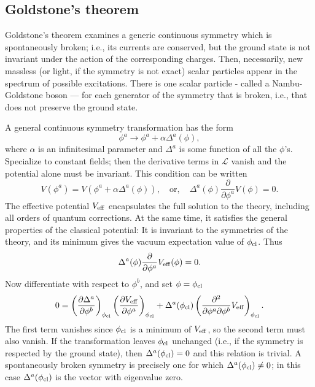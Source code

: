 \subsection{Goldstone's theorem}
\begin{newthem}
Goldstone's theorem examines a generic continuous symmetry which is spontaneously broken; i.e., its currents are conserved, but the ground state is not invariant under the action of the corresponding charges. Then, necessarily, new massless (or light, if the symmetry is not exact) scalar particles appear in the spectrum of possible excitations. There is one scalar particle - called a Nambu-Goldstone boson — for each generator of the symmetry that is broken, i.e., that does not preserve the ground state.
\end{newthem}
\begin{newproof}
A general continuous symmetry transformation has the form
\[\phi^a \to \phi^a + \alpha \Delta^a (\phi),\]
where $\alpha$ is an infinitesimal parameter and $\Delta^a$ is some function of all the $\phi$'s. Specialize to constant fields; then the derivative terms in $\mathcal{L}$ vanish and the potential alone must be invariant. This condition can be written
\[V(\phi^a) = V(\phi^a + \alpha \Delta^a (\phi)) , \quad \mbox{or} , \quad \Delta^a(\phi) \frac{\partial}{\partial \phi^a} V(\phi) = 0.\]
The effective potential $V_{\rm eff}$ encapsulates the full solution to the theory, including all orders of quantum corrections. At the same time, it satisfies the general properties of the classical potential: It is invariant to the symmetries of the theory, and its minimum gives the vacuum expectation value of $\phi_{\rm cl}$. Thus
\[\Delta^a(\phi) \frac{\partial}{\partial \phi^a} V_{\rm eff}(\phi) = 0.\]
Now differentiate with respect to $\phi^b$, and set $\phi = \phi_{\rm cl}$
\[0 = \left( \frac{\partial \Delta^a}{\partial \phi^b} \right)_{\phi_{\rm cl}} \left( \frac{\partial V_{\rm eff}}{\partial \phi^a}\right)_{\phi_{\rm cl}} + \Delta^a(\phi_{\rm cl}) \left( \frac{\partial^2}{\partial \phi^a \partial \phi^b}V_{\rm eff}\right)_{\phi_{\rm cl}}.\]
The first term vanishes since $\phi_{\rm cl}$ is a minimum of $V_{\rm eff}$, so the second term must also vanish. If the transformation leaves $\phi_{\rm cl}$ unchanged (i.e., if the symmetry is respected by the ground state), then $\Delta^a(\phi_{\rm cl})=0$ and this relation is trivial. A spontaneously broken symmetry is precisely one for which $\Delta^a(\phi_{\rm cl}) \neq 0$; in this
case $\Delta^a(\phi_{\rm cl})$ is the vector with eigenvalue zero.

\end{newproof}

